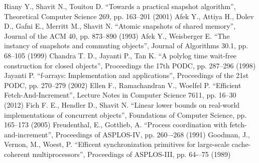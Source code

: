 \documentclass[a4paper,11pt]{article}
\begin{document}
\begin{thebibliography}{9}
	 Riany Y., Shavit N., Touitou D. ``Towards a practical snapshot algorithm'', Theoretical Computer Science 269, pp. 163--201 (2001)
	 Afek Y., Attiya H., Dolev D., Gafni E., Merritt M., Shavit N. ``Atomic snapshots of shared memory'', Journal of the ACM 40, pp. 873--890 (1993)
	 Afek Y., Weisberger E. ``The instancy of snapshots and commuting objects'', Journal of Algorithms 30.1, pp. 68--105 (1999)
	 Chandra T. D., Jayanti P., Tan K. ``A polylog time wait-free construction for closed objects'', Proceedings the 17th PODC, pp. 287--296 (1998)
	 Jayanti P. ``f-arrays: Implementation and applications'', Proceedings of the 21st PODC, pp. 270--279 (2002)
	 Ellen F., Ramachandran V., Woelfel P. ``Efficient Fetch-And-Increment'', Lecture Notes in Computer Science 7611, pp. 16--30 (2012)
	 Fich F. E., Hendler D., Shavit N. ``Linear lower bounds on real-world implementations of concurrent objects'', Foundations of Computer Science, pp. 165--173 (2005)
	 Freudenthal, E., Gottlieb, A. ``Process coordination with fetch-and-increment'', Proceedings of ASPLOS-IV, pp. 260–-268 (1991)
	 Goodman, J., Vernon, M., Woest, P. ``Efficent synchronization primitives for large-scale cache-coherent multiprocessors'', Proceedings of ASPLOS-III, pp. 64-–75 (1989)
\end{thebibliography}
\end{document}
